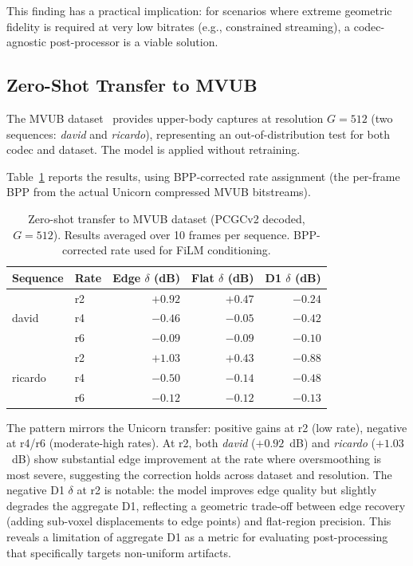 This finding has a practical implication: for scenarios where extreme geometric
fidelity is required at very low bitrates (e.g., constrained streaming),
a codec-agnostic post-processor is a viable solution.

\subsection{Zero-Shot Transfer to MVUB}
\label{ssec:mvub}

The MVUB dataset~\cite{loop2016mvub} provides upper-body captures at
resolution $G = 512$ (two sequences: \textit{david} and \textit{ricardo}),
representing an out-of-distribution test for both codec and dataset.
The model is applied without retraining.

Table~\ref{tab:mvub-results} reports the results, using BPP-corrected
rate assignment (the per-frame BPP from the actual Unicorn compressed
MVUB bitstreams).

\begin{table}[t]
  \centering
  \caption{%
    Zero-shot transfer to MVUB dataset (PCGCv2 decoded, $G=512$).
    Results averaged over 10 frames per sequence.
    BPP-corrected rate used for FiLM conditioning.
  }
  \label{tab:mvub-results}
  \begin{tabular}{llrrr}
    \toprule
    Sequence & Rate & Edge $\delta$ (dB) & Flat $\delta$ (dB) & D1 $\delta$ (dB) \\
    \midrule
    \multirow{3}{*}{david}
      & r2 & $\mathbf{+0.92}$ & $\mathbf{+0.47}$ & $-0.24$ \\
      & r4 & $-0.46$ & $-0.05$ & $-0.42$ \\
      & r6 & $-0.09$ & $-0.09$ & $-0.10$ \\
    \midrule
    \multirow{3}{*}{ricardo}
      & r2 & $\mathbf{+1.03}$ & $\mathbf{+0.43}$ & $-0.88$ \\
      & r4 & $-0.50$ & $-0.14$ & $-0.48$ \\
      & r6 & $-0.12$ & $-0.12$ & $-0.13$ \\
    \bottomrule
  \end{tabular}
\end{table}

The pattern mirrors the Unicorn transfer: positive gains at r2 (low rate),
negative at r4/r6 (moderate-high rates).
At r2, both \textit{david} ($+0.92$~dB) and \textit{ricardo} ($+1.03$~dB)
show substantial edge improvement at the rate where oversmoothing is most
severe, suggesting the correction holds across dataset and resolution.
The negative D1 $\delta$ at r2 is notable: the model improves edge quality
but slightly degrades the aggregate D1, reflecting a geometric trade-off
between edge recovery (adding sub-voxel displacements to edge points) and
flat-region precision.
This reveals a limitation of aggregate D1 as a metric for evaluating
post-processing that specifically targets non-uniform artifacts.

